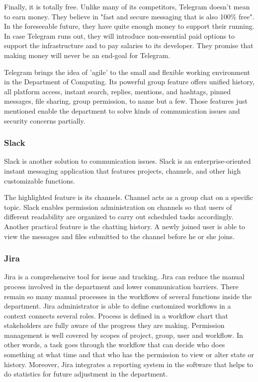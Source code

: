 Finally, it is totally free. Unlike many of its competitors, Telegram doesn't mean to earn money. They believe in "fast and secure messaging that is also 100\% free".  In the foreseeable future, they have quite enough money to support their running. In case Telegram runs out, they will introduce non-essential paid options to support the infrastructure and to pay salaries to its developer. They promise that making money will never be an end-goal for Telegram.

Telegram brings the idea of 'agile' to the small and flexible working environment in the Department of Computing. Its powerful group feature offers unified history, all platform access, instant search, replies, mentions, and hashtags, pinned messages, file sharing, group permission, to name but a few. Those features just mentioned enable the department to solve kinds of communication issues and security concerns partially.

\subsubsection{Slack}
Slack is another solution to communication issues. Slack is an enterprise-oriented instant messaging application that features projects, channels, and other high customizable functions.

The highlighted feature is its channels. Channel acts as a group chat on a specific topic. Slack enables permission administration on channels so that users of different readability are organized to carry out scheduled tasks accordingly. Another practical feature is the chatting history. A newly joined user is able to view the messages and files submitted to the channel before he or she joins.

\subsubsection{Jira}

Jira is a comprehensive tool for issue and tracking. Jira can reduce the manual process involved in the department and lower communication barriers. There remain so many manual processes in the workflows of several functions inside the department. Jira administrator is able to define customized workflows in a context connects several roles. Process is defined in a workflow chart that stakeholders are fully aware of the progress they are making. Permission management is well covered by scopes of project, group, user and workflow. In other words, a task goes through the workflow that can decide who does something at what time and that who has the permission to view or alter state or history. Moreover, Jira integrates a reporting system in the software that helps to do statistics for future adjustment in the department.

